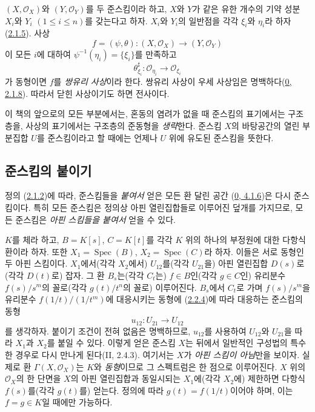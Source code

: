 \begin{env}[2.2.9]
\label{I.2.2.9-ko}
$(X,\mathscr{O}_X)$와 $(Y,\mathscr{O}_Y)$를 두 준스킴이라 하고, $X$와
$Y$가 같은 유한 개수의 기약 성분 $X_i$와 $Y_i$
$(1\leq i\leq n)$를 갖는다고 하자. $X_i$와 $Y_i$의 일반점을 각각
$\xi_i$와 $\eta_i$라 하자
(\hyperref[I.2.1.5-ko]{2.1.5}). 사상
\[
  f=(\psi,\theta):(X,\mathscr{O}_X)\longrightarrow(Y,\mathscr{O}_Y)
\]
이 모든 $i$에 대하여 $\psi^{-1}(\eta_i)=\{\xi_i\}$를 만족하고
\[
  \theta_{\xi_i}^{\sharp}:\mathscr{O}_{\eta_i}\longrightarrow
  \mathscr{O}_{\xi_i}
\]
가 동형이면 $f$를 \emph{쌍유리 사상}이라 한다. 쌍유리 사상이 우세
사상임은 명백하다(\hyperref[0.2.1.8-ko]{0, 2.1.8}). 따라서 닫힌
사상이기도 하면 전사이다.
\end{env}

\begin{notation}[2.2.10]
\label{I.2.2.10-ko}
이 책의 앞으로의 모든 부분에서는, 혼동의 염려가 없을 때 준스킴의
표기에서는 구조층을, 사상의 표기에서는 구조층의 준동형을
\emph{생략}한다. 준스킴 $X$의 바탕공간의 열린 부분집합 $U$를
준스킴이라고 할 때에는 언제나 $U$ 위에 유도된 준스킴을 뜻한다.
\end{notation}

\subsection{준스킴의 붙이기}
\label{subsection:I.2.3-ko}

\begin{env}[2.3.1]
\label{I.2.3.1-ko}
정의 (\hyperref[I.2.1.2-ko]{2.1.2})에 따라, 준스킴들을
\emph{붙여서} 얻은 모든 환 달린 공간
(\hyperref[0.4.1.6-ko]{0, 4.1.6})은 다시 준스킴이다. 특히 모든
준스킴은 정의상 아핀 열린집합들로 이루어진 덮개를 가지므로, 모든
준스킴은 \emph{아핀 스킴들을 붙여서} 얻을 수 있다.
\end{env}

\begin{example}[2.3.2]
\label{I.2.3.2-ko}
$K$를 체라 하고, $B=K[s]$, $C=K[t]$를 각각 $K$ 위의 하나의 부정원에
대한 다항식환이라 하자. 또한 $X_1=\operatorname{Spec}(B)$,
$X_2=\operatorname{Spec}(C)$라 하자. 이들은 서로 동형인 두 아핀
스킴이다. $X_1$에서(각각 $X_2$에서) $U_{12}$를(각각 $U_{21}$을)
아핀 열린집합 $D(s)$로(각각 $D(t)$로) 잡자. 그 환 $B_s$는(각각
$C_t$는) $f\in B$인(각각 $g\in C$인) 유리분수 $f(s)/s^m$의
꼴로(각각 $g(t)/t^n$의 꼴로) 이루어진다. $B_s$에서 $C_t$로 가며
$f(s)/s^m$을 유리분수 $f(1/t)/(1/t^m)$에 대응시키는 동형에
(\hyperref[I.2.2.4-ko]{2.2.4})에 따라 대응하는 준스킴의 동형
\[
  u_{12}:U_{21}\longrightarrow U_{12}
\]
를 생각하자. 붙이기 조건이 전혀 없음은 명백하므로, $u_{12}$를
사용하여 $U_{12}$와 $U_{21}$을 따라 $X_1$과 $X_2$를 붙일 수 있다.
이렇게 얻은 준스킴 $X$는 뒤에서 일반적인 구성법의 특수한 경우로
다시 만나게 된다(II, 2.4.3). 여기서는 $X$가 \emph{아핀 스킴이
아님}만을 보이자. 실제로 환 $\Gamma(X,\mathscr{O}_X)$는 $K$와
\emph{동형}이므로 그 스펙트럼은 한 점으로 이루어진다. $X$ 위의
$\mathscr{O}_X$의 한 단면을 $X$의 아핀 열린집합과 동일시되는
$X_1$에(각각 $X_2$에) 제한하면 다항식 $f(s)$를(각각 $g(t)$를)
얻는다. 정의에 따라 $g(t)=f(1/t)$이어야 하며, 이는
$f=g\in K$일 때에만 가능하다.
\end{example}

